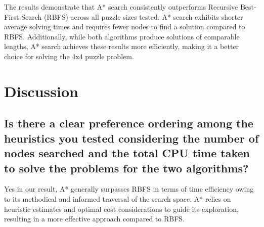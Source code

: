 \documentclass{article}
\begin{document}
 
\begin{table}[!h]
  \centering
  \caption{Comparison of A* Search and RBFS on Different Puzzle Sizes}\end{table}

\label{table:results}
 

 
The results demonstrate that A* search consistently outperforms Recursive Best-First Search (RBFS) across all puzzle sizes tested. A* search exhibits shorter average solving times and requires fewer nodes to find a solution compared to RBFS. Additionally, while both algorithms produce solutions of comparable lengths, A* search achieves these results more efficiently, making it a better choice for solving the 4x4 puzzle problem.

\section{Discussion}
\subsection{  Is there a clear preference ordering among the heuristics you tested considering the number of nodes searched and the total CPU time taken to solve the problems for the two algorithms?}

{Yes in our result, A* generally surpasses RBFS in terms of time efficiency owing to its methodical and informed traversal of the search space. A* relies on heuristic estimates and optimal cost considerations to guide its exploration, resulting in a more effective approach compared to RBFS.}
\end{document}
